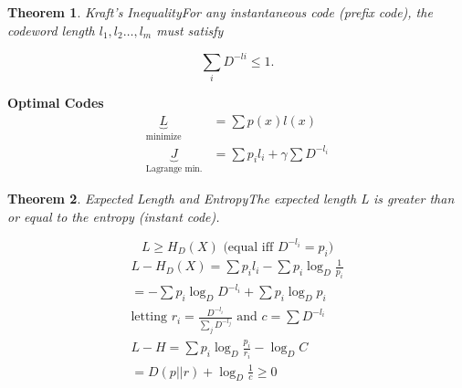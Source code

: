 \documentclass[10pt]{article}
\newtheorem{thm}{Theorem}[section]
\begin{document}
\begin{tiny}
\begin{multicols}{3}
\begin{thm}{Kraft's Inequality}\label{thm: kraft}
For any instantaneous code (prefix code), the codeword length $l_1,l_2 \ldots , l_m$ must satisfy
\end{thm}

\begin{equation}
\sum_i D^{-li}  \leq 1.
\end{equation}

\textbf{\scriptsize Optimal Codes}
\begin{align}
\underbrace{L}_\text{minimize}&= \sum p(x)l(x) \label{defn: minimize}\\
\underbrace{J}_\text{Lagrange min.}&= \sum {p_i}{l_i} + \gamma \sum D^{-l_i} \label{defn: lagrange}
\end{align}

\begin{thm}{Expected Length and Entropy}\label{thm: codewordentropy}
The expected length L is greater than or equal to the entropy (instant code).
\end{thm}

\begin{equation}
L \geq H_D(X) \text{ (equal iff } D^{-l_i} = p_i \text{)}
\end{equation}
\begin{eqnarray}
L - H_D(X) = \sum {p_i}{l_i} - \sum {p_i} \log_D \frac {1}{p_i}\\
= - \sum {p_i} \log_D D^{-l_i} + \sum {p_i} \log_D {p_i} \\
\text{letting } {r_i} = \frac {D^{-l_i}}{\sum_j D^{-l_j}} \text{ and } c = \sum D^{-l_i} \\
L - H = \sum {p_i} \log_D \frac {p_i}{r_i} - \log_D C \\
= D(p||r) + \log_D \frac {1}{c} \geq 0 
\end{eqnarray}





\end{multicols}
\end{tiny}
\end{document}
